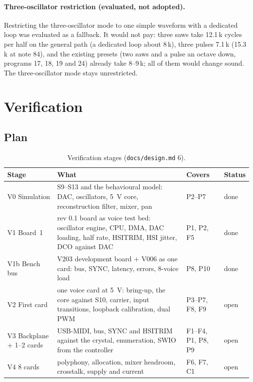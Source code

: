 \documentclass[11pt,a4paper]{article}
\newcommand{\file}[1]{\texttt{#1}}
\begin{document}
\paragraph{Three-oscillator restriction (evaluated, not adopted).} Restricting the three-oscillator mode to one
simple waveform with a dedicated loop was evaluated as a fallback. It would not pay: three saws take 12.1\,k cycles
per half on the general path (a dedicated loop about 8\,k), three pulses 7.1\,k (15.3\,k at note 84), and the existing
presets (two saws and a pulse an octave down, programs 17, 18, 19 and 24) already take 8--9\,k; all of them would
change sound. The three-oscillator mode stays unrestricted.

\section{Verification}\label{sec:verif}

\subsection{Plan}
\begin{table}[htbp]
\centering\small
\caption{Verification stages (\file{docs/design.md} 6).}\label{tab:vstages}
\begin{tabularx}{\textwidth}{@{}l X l l@{}}
\toprule
Stage & What & Covers & Status \\
\midrule
V0 Simulation & S9--S13 and the behavioural model: DAC, oscillators, \SI{5}{V} core, reconstruction filter, mixer, pan
  & P2--P7 & done \\
V1 Board~1 & rev 0.1 board as voice test bed: oscillator engine, CPU, DMA, DAC loading, half rate, HSITRIM, HSI
  jitter, DCO against DAC & P1, P2, F5 & done \\
V1b Bench bus & V203 development board + V006 as one card: bus, SYNC, latency, errors, 8-voice load & P8, P10 & done \\
V2 First card & one voice card at \SI{5}{V}: bring-up, the core against S10, carrier, input transitions, loopback
  calibration, dual PWM & P3--P7, F8, F9 & open \\
V3 Backplane + 1--2 cards & USB-MIDI, bus, SYNC and HSITRIM against the crystal, enumeration, SWIO from the controller
  & F1--F4, P1, P8, P9 & open \\
V4 8 cards & polyphony, allocation, mixer headroom, crosstalk, supply and current & F6, F7, C1 & open \\
\bottomrule
\end{tabularx}
\end{table}
\end{document}
